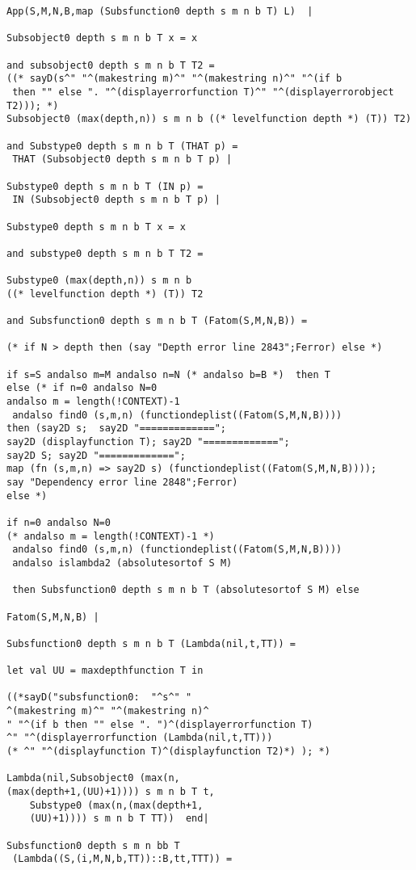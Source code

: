 \documentclass[12pt]{article}
\begin{document}
\begin{verbatim}
App(S,M,N,B,map (Subsfunction0 depth s m n b T) L)  |

Subsobject0 depth s m n b T x = x

and subsobject0 depth s m n b T T2 =
((* sayD(s^" "^(makestring m)^" "^(makestring n)^" "^(if b
 then "" else ". "^(displayerrorfunction T)^" "^(displayerrorobject T2))); *)
Subsobject0 (max(depth,n)) s m n b ((* levelfunction depth *) (T)) T2)

and Substype0 depth s m n b T (THAT p) =
 THAT (Subsobject0 depth s m n b T p) |

Substype0 depth s m n b T (IN p) =
 IN (Subsobject0 depth s m n b T p) |

Substype0 depth s m n b T x = x

and substype0 depth s m n b T T2 =

Substype0 (max(depth,n)) s m n b 
((* levelfunction depth *) (T)) T2

and Subsfunction0 depth s m n b T (Fatom(S,M,N,B)) = 

(* if N > depth then (say "Depth error line 2843";Ferror) else *)

if s=S andalso m=M andalso n=N (* andalso b=B *)  then T
else (* if n=0 andalso N=0
andalso m = length(!CONTEXT)-1
 andalso find0 (s,m,n) (functiondeplist((Fatom(S,M,N,B))))
then (say2D s;  say2D "=============";
say2D (displayfunction T); say2D "=============";
say2D S; say2D "=============";
map (fn (s,m,n) => say2D s) (functiondeplist((Fatom(S,M,N,B))));
say "Dependency error line 2848";Ferror)
else *) 

if n=0 andalso N=0
(* andalso m = length(!CONTEXT)-1 *)
 andalso find0 (s,m,n) (functiondeplist((Fatom(S,M,N,B))))
 andalso islambda2 (absolutesortof S M)
 
 then Subsfunction0 depth s m n b T (absolutesortof S M) else

Fatom(S,M,N,B) |

Subsfunction0 depth s m n b T (Lambda(nil,t,TT)) =

let val UU = maxdepthfunction T in

((*sayD("subsfunction0:  "^s^" "
^(makestring m)^" "^(makestring n)^
" "^(if b then "" else ". ")^(displayerrorfunction T)
^" "^(displayerrorfunction (Lambda(nil,t,TT)))
(* ^" "^(displayfunction T)^(displayfunction T2)*) ); *)

Lambda(nil,Subsobject0 (max(n,
(max(depth+1,(UU)+1)))) s m n b T t,
    Substype0 (max(n,(max(depth+1,
	(UU)+1)))) s m n b T TT))  end|

Subsfunction0 depth s m n bb T
 (Lambda((S,(i,M,N,b,TT))::B,tt,TTT)) =
 

\end{verbatim}
\end{document}
